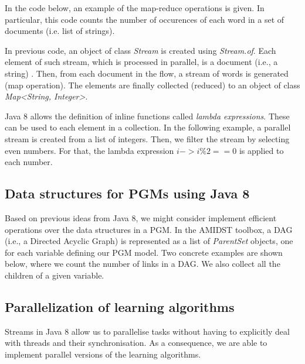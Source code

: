 \documentclass[10pt,a4paper]{article}
\begin{document}
In the code below, an example of the map-reduce operations is given. In particular, this code counts the number of occurences of each word in a set of documents (i.e. list of strings).






In previous code, an object of class \textit{Stream} is created using \textit{Stream.of}. Each element of such stream, which is processed in parallel, is a document (i.e., a string) . Then, from each document in the flow, a stream of words is generated (map operation). The elements are finally collected (reduced) to an object of class \textit{Map<String, Integer>}.\newline

Java 8 allows the definition of inline functions called \textit{lambda expressions}. These can be used to each element in a collection. In the following example, a parallel stream is created from a list of integers. Then, we filter the stream by selecting even numbers. For that, the lambda expression \textit{$i ->i \% 2 == 0$} is applied to each number.\newline 



\subsection{Data structures for PGMs using Java 8}\label{sec:blog:multicore:pgms}

Based on previous ideas from Java 8, we might consider implement efficient operations over the data structures in a PGM.  In the AMIDST toolbox, a DAG  (i.e., a Directed Acyclic Graph) is represented as a list of \textit{ParentSet} objects, one for each variable defining our PGM model. Two concrete examples are shown below, where we count the number of links in a DAG. We also collect all the children of a given variable. 



\subsection{Parallelization of learning algorithms}\label{sec:blog:multicore:learning}
Streams in Java 8 allow us to parallelise tasks without having to explicitly deal with threads and their synchronisation. As a consequence, we are able to implement parallel versions of the learning algorithms.\newline  
\end{document}
